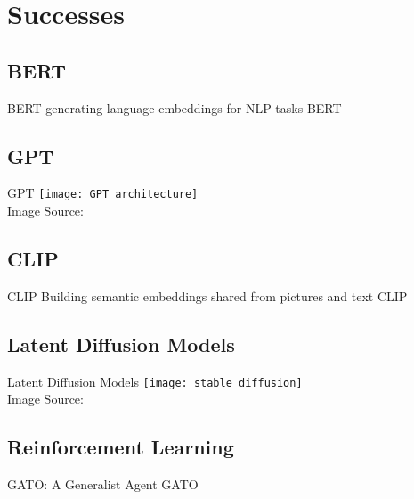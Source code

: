 \section{Successes}
\subsection{BERT}
\begin{frame}[c]{BERT}
    generating language embeddings for NLP tasks
    BERT \cite{devlin_bert_2018}
\end{frame}

\subsection{GPT}
\begin{frame}[c]{GPT}
    \texttt{[image: GPT\_architecture]} \\
    Image Source: \cite{mody_gpt_2023}
\end{frame}

\subsection{CLIP}
\begin{frame}[c]{CLIP}
    Building semantic embeddings shared from pictures and text
    CLIP \cite{radford_learning_2021}
\end{frame}

\subsection{Latent Diffusion Models}
\begin{frame}[c]{Latent Diffusion Models}
    \texttt{[image: stable\_diffusion]} \\
    Image Source: \cite{rombach_highresolution_2022}
\end{frame}

\subsection{Reinforcement Learning}
\begin{frame}[c]{GATO: A Generalist Agent}
    GATO \cite{reed_generalist_2022}
\end{frame}

